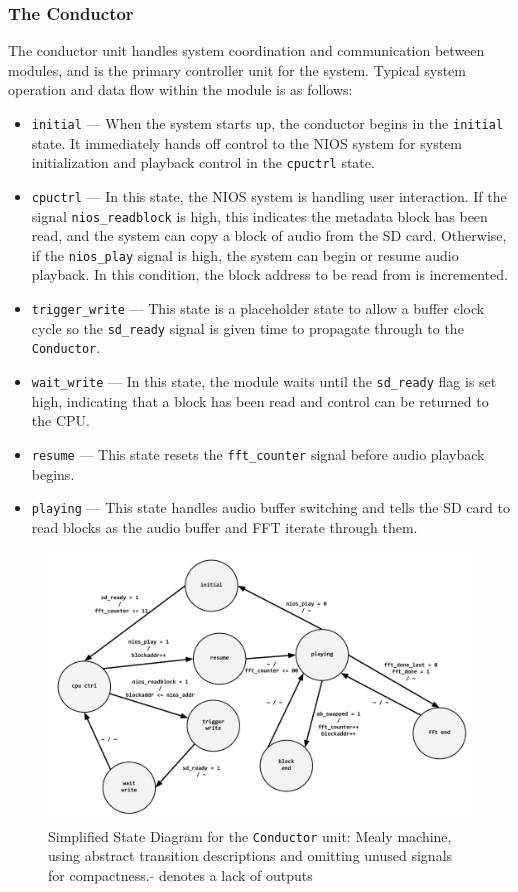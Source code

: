 \documentclass{article}
\begin{document}
\subsubsection{The Conductor}
The conductor unit handles system coordination and communication between modules, and is the primary controller unit for the system. Typical system operation and data flow within the module is as follows:
\begin{itemize}
\item \texttt{initial} --- When the system starts up, the conductor begins in the \texttt{initial} state. It immediately hands off control to the NIOS system for system initialization and playback control in the \texttt{cpuctrl} state.
\item \texttt{cpuctrl} --- In this state, the NIOS system is handling user interaction. If the signal \texttt{nios\_readblock} is high, this indicates the metadata block has been read, and the system can copy a block of audio from the SD card. Otherwise, if the \texttt{nios\_play} signal is high, the system can begin or resume audio playback. In this condition, the block address to be read from is incremented.
\item \texttt{trigger\_write} --- This state is a placeholder state to allow a buffer clock cycle so the \texttt{sd\_ready} signal is given time to propagate through to the \texttt{Conductor}.
\item \texttt{wait\_write} --- In this state, the module waits until the \texttt{sd\_ready} flag is set high, indicating that a block has been read and control can be returned to the CPU.
\item \texttt{resume} --- This state resets the \texttt{fft\_counter} signal before audio playback begins.
\item \texttt{playing} --- This state handles audio buffer switching and tells the SD card to read blocks as the audio buffer and FFT iterate through them. 
\end{itemize}
\begin{figure}[H]
  \centering
    \includegraphics[width=6in]{conductor_state.pdf}
  \caption{Simplified State Diagram for the \texttt{Conductor} unit:
    Mealy machine, using abstract transition descriptions and omitting unused
    signals for compactness. \(\widetilde{}\)   denotes a lack of outputs}
\end{figure}
\end{document}
